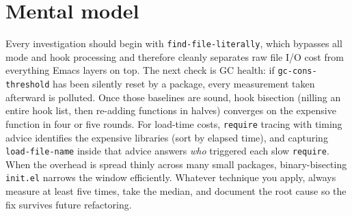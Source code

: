 \section{Mental model}
Every investigation should begin with \texttt{find-file-literally},
which bypasses all mode and hook processing and therefore cleanly
separates raw file I/O cost from everything Emacs layers on top.  The
next check is GC health: if \texttt{gc-cons-threshold} has been
silently reset by a package, every measurement taken afterward is
polluted.  Once those baselines are sound, hook bisection (nilling an
entire hook list, then re-adding functions in halves) converges on the
expensive function in four or five rounds.  For load-time costs,
\texttt{require} tracing with timing advice identifies the expensive
libraries (sort by elapsed time), and capturing
\texttt{load-file-name} inside that advice answers \emph{who} triggered
each slow \texttt{require}.  When the overhead is spread thinly across
many small packages, binary-bisecting \texttt{init.el} narrows the
window efficiently.  Whatever technique you apply, always measure at
least five times, take the median, and document the root cause so the
fix survives future refactoring.
